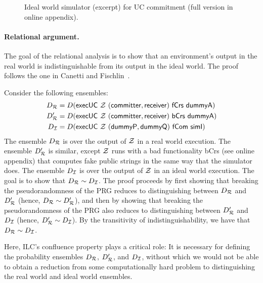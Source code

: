 \begin{figure}

\caption{Ideal world simulator (excerpt) for UC commitment (full version in
  online appendix).}
\label{fig:sim-short}
\end{figure}


\paragraph{Relational argument.}
The goal of the relational analysis is to show that an environment's output in
the real world is indistinguishable from its output in the ideal world. The
proof follows the one in Canetti and Fischlin~\cite{canetti2001commitments}.

\begin{sketch}
  Consider the following ensembles:
  \begin{align*}
    D_{\mathcal{{R}}} &= D(\mathsf{execUC~\mathcal{{Z}}~(committer, receiver)~fCrs~dummyA})\\
    D_{\mathcal{{R}}}' &= D(\mathsf{execUC~\mathcal{{Z}}~(committer, receiver)~bCrs~dummyA})\\
    D_{\mathcal{{I}}} &= D(\mathsf{execUC~\mathcal{{Z}}~(dummyP, dummyQ)~fCom~simI})
  \end{align*}
  \noindent The ensemble $D_{\mathcal{{R}}}$ is over the output of $\mathcal{{Z}}$ in a real
  world execution. The ensemble $D_{\mathcal{{R}}}'$ is similar, except $\mathcal{{Z}}$ runs
  with a bad functionality \textsf{bCrs} (see online appendix) that computes fake
  public strings in the same way that the simulator does. The ensemble
  $D_{\mathcal{{I}}}$ is over the output of $\mathcal{{Z}}$ in an ideal world execution. The
  goal is to show that $D_{\mathcal{{R}}} \sim D_{\mathcal{{I}}}$.
%  
  The proof proceeds by first showing that breaking the pseudorandomness of the
  PRG reduces to distinguishing between $D_{\mathcal{{R}}}$ and $D_{\mathcal{{R}}}'$ (hence,
  $D_{\mathcal{{R}}} \sim D_{\mathcal{{R}}}'$), and then by showing that breaking the
  pseudorandomness of the PRG also reduces to distinguishing between
  $D_{\mathcal{{R}}}'$ and $D_{\mathcal{{I}}}$ (hence, $D_{\mathcal{{R}}}' \sim D_{\mathcal{{I}}}$). By the
  transitivity of indistinguishability, we have that ${D_{\mathcal{{R}}} \sim D_{\mathcal{{I}}}}$.
\end{sketch}

Here, ILC's confluence property plays a critical role: It is necessary for
defining the probability ensembles $D_{\mathcal{{R}}}$, $D_{\mathcal{{R}}}'$, and
$D_{\mathcal{{I}}}$, without which we would not be able to obtain a reduction from some
computationally hard problem to distinguishing the real world and ideal world
ensembles.

